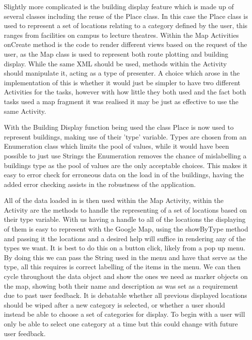 Slightly more complicated is the building display feature which is made up of several classes including the reuse of the Place class. In this case the Place class is used to represent a set of locations relating to a category defined by the user, this ranges from facilities on campus to lecture theatres. Within the Map Activities onCreate method is the code to render different views based on the request of the user, as the Map class is used to represent both route plotting and building display. While the same XML should be used, methods within the Activity should manipulate it, acting as a type of presenter. A choice which arose in the implementation of this is whether it would just be simpler to have two different Activities for the tasks, however with how little they both used and the fact both tasks used a map fragment it was realised it may be just as effective to use the same Activity. 

With the Building Display function being used the class Place is now used to represent buildings, making use of their 'type' variable. Types are chosen from an Enumeration class which limits the pool of values, while it would have been possible to just use Strings the Enumeration removes the chance of mislabelling a buildings type as the pool of values are the only acceptable choices. This makes it easy to error check for erroneous data on the load in of the buildings, having the added error checking assists in the robustness of the application. 

All of the data loaded in is then used within the Map Activity, within the Activity are the methods to handle the representing of a set of locations based on their type variable. With us having a handle to all of the locations the displaying of them is easy to represent with the Google Map\cite{maps}, using the showByType method and passing it the locations and a desired help will suffice in rendering any of the types we want. It is best to do this on a button click, likely from a pop up menu. By doing this we can pass the String used in the menu and have that serve as the type, all this requires is correct labelling of the items in the menu. We can then cycle throughout the data object and show the ones we need as marker objects on the map, showing both their name and description as was set as a requirement due to past user feedback. It is debatable whether all previous displayed locations should be wiped after a new category is selected, or whether a user should instead be able to choose a set of categories for display. To begin with a user will only be able to select one category at a time but this could change with future user feedback. 

